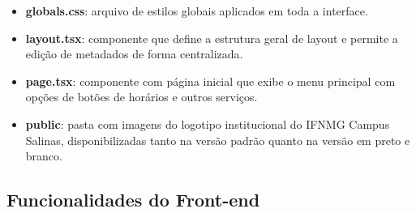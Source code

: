 \begin{itemize}
    \item \textbf{globals.css}: arquivo de estilos globais aplicados em toda a interface.
    \item \textbf{layout.tsx}: componente que define a estrutura geral de layout e permite a edição de metadados de forma centralizada.
    \item \textbf{page.tsx}: componente com página inicial que exibe o menu principal com opções de botões de horários e outros serviços.
    \item \textbf{public}: pasta com imagens do logotipo institucional do IFNMG Campus Salinas, disponibilizadas tanto na versão padrão quanto na versão em preto e branco.
\end{itemize}

\subsection{Funcionalidades do Front-end}

